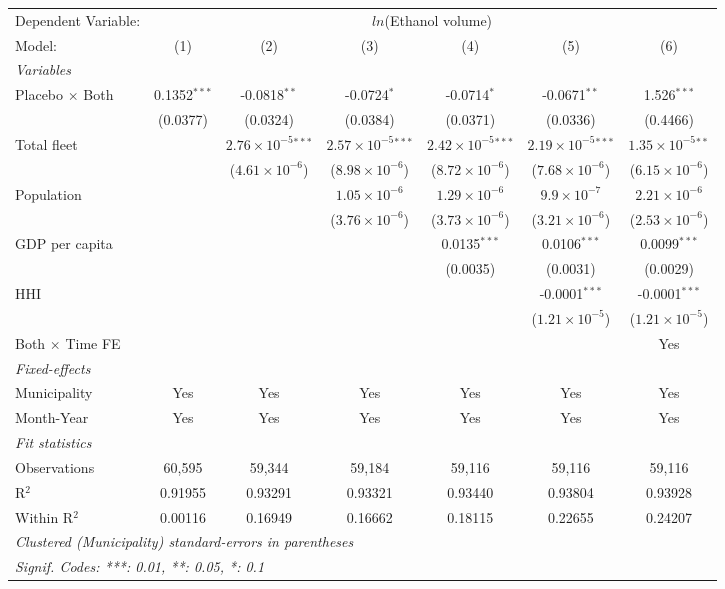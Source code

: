 \documentclass[
]{article}
\begin{document}
\begin{tabular}{lcccccc}
\tabularnewline\midrule\midrule
Dependent Variable:&\multicolumn{6}{c}{$ln$(Ethanol volume)}\\
Model:&(1) & (2) & (3) & (4) & (5) & (6)\\
\midrule \emph{Variables}&   &   &   &   &   &  \\
Placebo $\times $ Both & 0.1352$^{***}$ & -0.0818$^{**}$ & -0.0724$^{*}$ & -0.0714$^{*}$ & -0.0671$^{**}$ & 1.526$^{***}$\\
  &(0.0377) & (0.0324) & (0.0384) & (0.0371) & (0.0336) & (0.4466)\\
Total fleet &    & $2.76\times 10^{-5}$$^{***}$ & $2.57\times 10^{-5}$$^{***}$ & $2.42\times 10^{-5}$$^{***}$ & $2.19\times 10^{-5}$$^{***}$ & $1.35\times 10^{-5}$$^{**}$\\
  &   & ($4.61\times 10^{-6}$) & ($8.98\times 10^{-6}$) & ($8.72\times 10^{-6}$) & ($7.68\times 10^{-6}$) & ($6.15\times 10^{-6}$)\\
Population &    &    & $1.05\times 10^{-6}$ & $1.29\times 10^{-6}$ & $9.9\times 10^{-7}$ & $2.21\times 10^{-6}$\\
  &   &    & ($3.76\times 10^{-6}$) & ($3.73\times 10^{-6}$) & ($3.21\times 10^{-6}$) & ($2.53\times 10^{-6}$)\\
GDP per capita &    &    &    & 0.0135$^{***}$ & 0.0106$^{***}$ & 0.0099$^{***}$\\
  &   &    &    & (0.0035) & (0.0031) & (0.0029)\\
HHI &    &    &    &    & -0.0001$^{***}$ & -0.0001$^{***}$\\
  &   &    &    &    & ($1.21\times 10^{-5}$) & ($1.21\times 10^{-5}$)\\
Both $\times$ Time FE &  &  &  &  &  & Yes\\
\midrule \emph{Fixed-effects}&   &   &   &   &   &  \\
Municipality & Yes & Yes & Yes & Yes & Yes & Yes\\
Month-Year & Yes & Yes & Yes & Yes & Yes & Yes\\
\midrule \emph{Fit statistics}&  & & & & & \\
Observations & 60,595&59,344&59,184&59,116&59,116&59,116\\
R$^2$ & 0.91955&0.93291&0.93321&0.93440&0.93804&0.93928\\
Within R$^2$ & 0.00116&0.16949&0.16662&0.18115&0.22655&0.24207\\
\midrule\midrule\multicolumn{7}{l}{\emph{Clustered (Municipality) standard-errors in parentheses}}\\
\multicolumn{7}{l}{\emph{Signif. Codes: ***: 0.01, **: 0.05, *: 0.1}}\\
\end{tabular}
\end{document}
